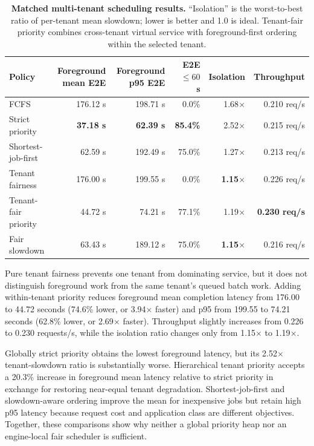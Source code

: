\documentclass[sigconf,review,anonymous]{acmart}
\begin{document}
\begin{table}[t]
    \centering
    \small
    \caption{\textbf{Matched multi-tenant scheduling results.} ``Isolation''
    is the worst-to-best ratio of per-tenant mean slowdown; lower is better
    and 1.0 is ideal. Tenant-fair priority combines cross-tenant virtual
    service with foreground-first ordering within the selected tenant.}
    \label{tab:multitenant}
    \begin{tabular}{lrrrrr}
        \toprule
        Policy & Foreground mean E2E & Foreground p95 E2E
        & E2E $\leq 60$ s & Isolation & Throughput \\
        \midrule
        FCFS & 176.12 s & 198.71 s & 0.0\% & 1.68$\times$ & 0.210 req/s \\
        Strict priority & \textbf{37.18 s} & \textbf{62.39 s}
            & \textbf{85.4\%} & 2.52$\times$ & 0.215 req/s \\
        Shortest-job-first & 62.59 s & 192.49 s
            & 75.0\% & 1.27$\times$ & 0.213 req/s \\
        Tenant fairness & 176.00 s & 199.55 s
            & 0.0\% & \textbf{1.15$\times$} & 0.226 req/s \\
        Tenant-fair priority & 44.72 s & 74.21 s
            & 77.1\% & 1.19$\times$ & \textbf{0.230 req/s} \\
        Fair slowdown & 63.43 s & 189.12 s
            & 75.0\% & \textbf{1.15$\times$} & 0.216 req/s \\
        \bottomrule
    \end{tabular}
\end{table}

Pure tenant fairness prevents one tenant from dominating service, but it does
not distinguish foreground work from the same tenant's queued batch work.
Adding within-tenant priority reduces foreground mean completion latency from
176.00 to 44.72 seconds (74.6\% lower, or 3.94$\times$ faster) and p95 from
199.55 to 74.21 seconds (62.8\% lower, or 2.69$\times$ faster). Throughput
slightly increases from 0.226 to 0.230 requests/s, while the isolation ratio
changes only from 1.15$\times$ to 1.19$\times$.

Globally strict priority obtains the lowest foreground latency, but its
2.52$\times$ tenant-slowdown ratio is substantially worse. Hierarchical
tenant priority accepts a 20.3\% increase in foreground mean latency relative
to strict priority in exchange for restoring near-equal tenant degradation.
Shortest-job-first and slowdown-aware ordering improve the mean for inexpensive
jobs but retain high p95 latency because request cost and application class are
different objectives. Together, these comparisons show why neither a global
priority heap nor an engine-local fair scheduler is sufficient.
\end{document}
